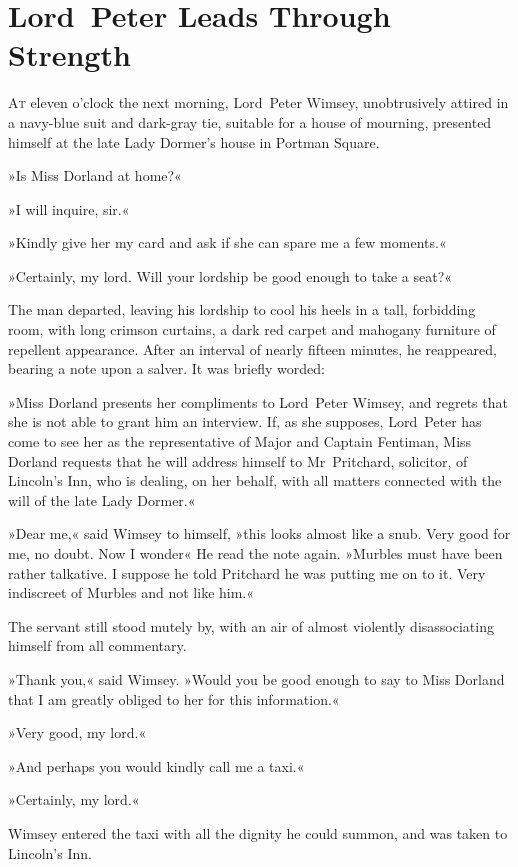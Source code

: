 \chapter{Lord~Peter Leads Through Strength}

\lettrine[lines=4]{A}{t} eleven o'clock the next morning, Lord~Peter Wimsey, unobtrusively attired in a navy-blue suit and dark-gray tie, suitable for a house of mourning, presented himself at the late Lady Dormer's house in Portman Square.

»Is Miss Dorland at home?«

»I will inquire, sir.«

»Kindly give her my card and ask if she can spare me a few moments.«

»Certainly, my lord. Will your lordship be good enough to take a seat?«

The man departed, leaving his lordship to cool his heels in a tall, forbidding room, with long crimson curtains, a dark red carpet and mahogany furniture of repellent appearance. After an interval of nearly fifteen minutes, he reappeared, bearing a note upon a salver. It was briefly worded:

»Miss Dorland presents her compliments to Lord~Peter Wimsey, and regrets that she is not able to grant him an interview. If, as she supposes, Lord~Peter has come to see her as the representative of Major and Captain Fentiman, Miss Dorland requests that he will address himself to Mr~Pritchard, solicitor, of Lincoln's Inn, who is dealing, on her behalf, with all matters connected with the will of the late Lady Dormer.«

»Dear me,« said Wimsey to himself, »this looks almost like a snub. Very good for me, no doubt. Now I wonder\longdash« He read the note again. »Murbles must have been rather talkative. I suppose he told Pritchard he was putting me on to it. Very indiscreet of Murbles and not like him.«

The servant still stood mutely by, with an air of almost violently disassociating himself from all commentary.

»Thank you,« said Wimsey. »Would you be good enough to say to Miss Dorland that I am greatly obliged to her for this information.«

»Very good, my lord.«

»And perhaps you would kindly call me a taxi.«

»Certainly, my lord.«

Wimsey entered the taxi with all the dignity he could summon, and was taken to Lincoln's Inn.


